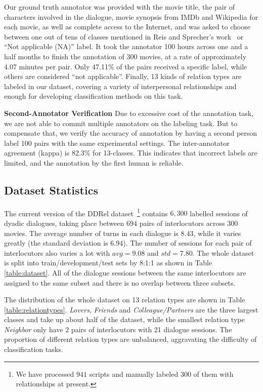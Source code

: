Our ground truth annotator was provided with the movie title, the pair of characters involved in the dialogue, movie synopsis from IMDb and Wikipedia for each movie, as well as complete access to the Internet, and was asked to choose between one out of tens of classes mentioned in Reis and Sprecher's work~\cite{reis2009encyclopedia} or ``Not applicable (NA)'' label.
It took the annotator 100 hours across one and a half months to finish the annotation of 300 movies, at a rate of approximately 4.07 minutes per pair. Only 47.11\% of the pairs received a specific label, while others are considered ``not applicable''. Finally, 13 kinds of relation types are labeled in our dataset, covering a variety of interpersonal relationships and enough for developing classification methods on this task.

\textbf{Second-Annotator Verification}
Due to excessive cost of the annotation task, we are not able to commit multiple annotators on the labeling task. But to compensate that, we verify the accuracy of annotation by having a second person label 100 pairs with the same experimental settings. The inter-annotator agreement (kappa) is 82.3\% for 13-classes. This indicates that incorrect labels are limited, and the annotation by the first human is reliable.




\subsection{Dataset Statistics}
The current version of the DDRel dataset~\footnote{We have processed $941$ scripts and 
	manually labeled $300$ of them with relationships at present.}
contains $6,300$ labelled sessions of dyadic dialogues, taking place between $694$ pairs of interlocutors across $300$ movies. 
The average number of turns in each dialogue is $8.43$, 
while it varies greatly (the standard deviation is $6.94$).  The number of sessions for each pair of interlocutors also varies a lot with $avg=9.08$ and $std=7.80$. The whole dataset is split into train/development/test sets by 8:1:1 as shown in Table \ref{table:dataset}. All of the dialogue sessions between the same interlocutors are assigned to the same subset and there is no overlap between three subsets. 


The distribution of the whole dataset on 13 relation types are shown in Table \ref{table:relationtypes}. {\em Lovers}, {\em Friends} and {\em Colleague/Partners} are the three largest classes and take up about half of the dataset, while the smallest relation type {\em Neighbor} only have 2 pairs of interlocutors with 21 dialogue sessions. The proportion of different relation types are unbalanced, aggravating the difficulty of classification tasks.




